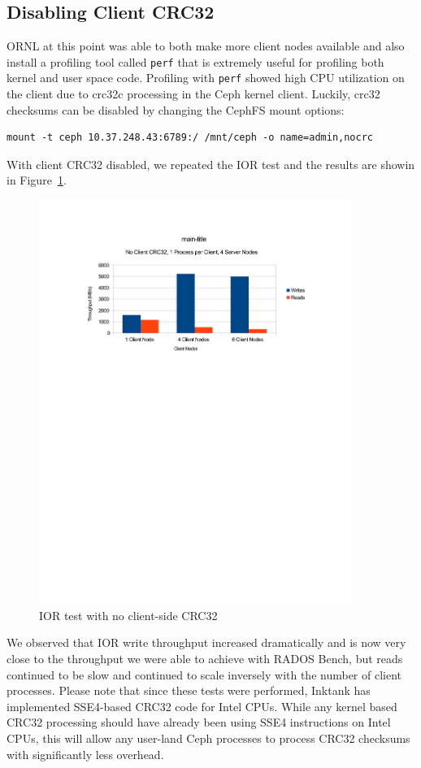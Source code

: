 \documentclass{article}
\begin{document}
\subsection{Disabling Client CRC32}

ORNL at this point was able to both make more client nodes available and also
install a profiling tool called \verb!perf! that is extremely useful for
profiling both kernel and user space code.  Profiling with \verb!perf! showed
high CPU utilization on the client due to crc32c processing in the Ceph kernel
client.  Luckily, crc32 checksums can be disabled by changing the CephFS mount
options:

\begin{Verbatim}
mount -t ceph 10.37.248.43:6789:/ /mnt/ceph -o name=admin,nocrc
\end{Verbatim}


With client CRC32 disabled, we repeated the IOR test and the results are showin
in Figure~\ref{fig:ior-no-client-crc32}. 

\begin{figure}[htb]
\centering
\includegraphics[width=4in]{ior-client-no-crc32}
\caption{IOR test with no client-side CRC32}
\label{fig:ior-no-client-crc32}
\end{figure}

We observed that IOR write throughput increased dramatically and is now very
close to the throughput we were able to achieve with RADOS Bench, but reads
continued to be slow and continued to scale inversely with the number of client
processes.  Please note that since these tests were performed, Inktank has
implemented SSE4-based CRC32 code for Intel CPUs.  While any kernel based CRC32
processing should have already been using SSE4 instructions on Intel CPUs, this
will allow any user-land Ceph processes to process CRC32 checksums with
significantly less overhead.
\end{document}
